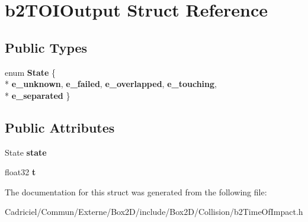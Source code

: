 \hypertarget{structb2_t_o_i_output}{}\section{b2\+T\+O\+I\+Output Struct Reference}
\label{structb2_t_o_i_output}
\subsection*{Public Types}
\begin{DoxyCompactItemize}
\item 
enum {\bfseries State} \{ \\*
{\bfseries e\+\_\+unknown}, 
{\bfseries e\+\_\+failed}, 
{\bfseries e\+\_\+overlapped}, 
{\bfseries e\+\_\+touching}, 
\\*
{\bfseries e\+\_\+separated}
 \}\hypertarget{structb2_t_o_i_output_a12c3cf4dc0551f5c8249dc1dd867959a}{}\label{structb2_t_o_i_output_a12c3cf4dc0551f5c8249dc1dd867959a}

\end{DoxyCompactItemize}
\subsection*{Public Attributes}
\begin{DoxyCompactItemize}
\item 
State {\bfseries state}\hypertarget{structb2_t_o_i_output_aaacbf28f437b965ffecabf1407a77915}{}\label{structb2_t_o_i_output_aaacbf28f437b965ffecabf1407a77915}

\item 
float32 {\bfseries t}\hypertarget{structb2_t_o_i_output_a94f8b756e060892226ec006db4be7ee3}{}\label{structb2_t_o_i_output_a94f8b756e060892226ec006db4be7ee3}

\end{DoxyCompactItemize}


The documentation for this struct was generated from the following file\+:\begin{DoxyCompactItemize}
\item 
Cadriciel/\+Commun/\+Externe/\+Box2\+D/include/\+Box2\+D/\+Collision/b2\+Time\+Of\+Impact.\+h\end{DoxyCompactItemize}
